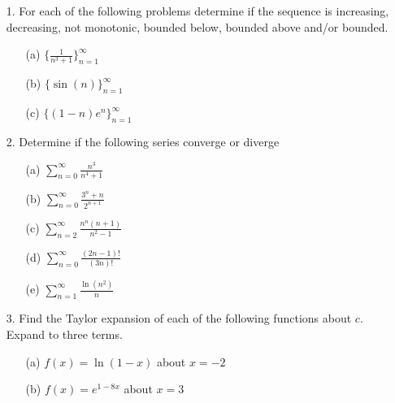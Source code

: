 \documentclass[12pt, amssymb, one column]{article}
\begin{document}
\begin{itemize}
	\item[1.] For each of the following problems determine if the sequence is increasing, decreasing, not monotonic, bounded below, bounded above and/or bounded.
		\begin{itemize}
			\item[(a)] $\{\frac{1}{n^3+1}\}_{n=1}^\infty$
			\item[(b)] $\{\sin(n)\}_{n=1}^\infty$
			\item[(c)] $\{(1-n)e^n\}_{n=1}^\infty$
		\end{itemize}
	
	\item[2.] Determine if the following series converge or diverge
		\begin{itemize}
			\item[(a)]$\sum_{n=0}^\infty \frac{n^3}{n^4+1}$
			\item[(b)]$\sum_{n=0}^\infty \frac{3^n+n}{2^{n+1}}$
			\item[(c)]$\sum_{n=2}^\infty \frac{n^n(n+1)}{n^2-1}$
			\item[(d)]$\sum_{n=0}^{\infty} \frac{(2n-1)!}{(3n)!}$
			\item[(e)]$\sum_{n=1}^\infty \frac{\ln (n^2)}{n}$
		\end{itemize}
	
	\item[3.] Find the Taylor expansion of each of the following functions about $c$. Expand to three terms.
		\begin{itemize}
			\item[(a)] $f(x) = \ln (1-x)$ about $x=-2$
			\item[(b)] $f(x) = e^{1-8x}$ about $x=3$
		\end{itemize}
			
\end{itemize}
\end{document}
